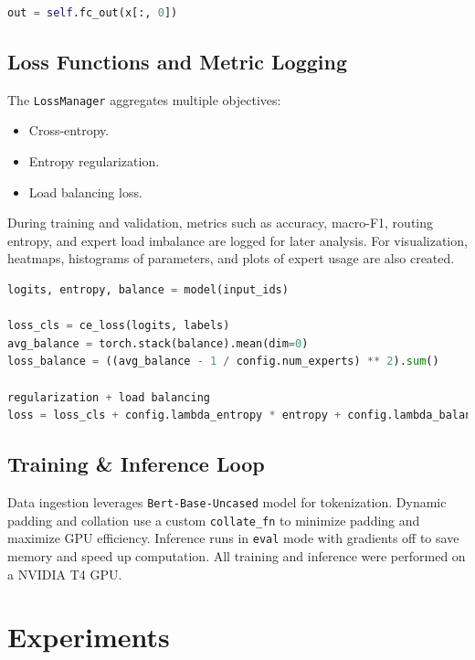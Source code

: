 \documentclass{article}
\begin{document}
\vspace{3pt}
\begin{lstlisting}[language=Python, caption=\texttt{x[:, 0]} is the final token embedding., label={lst:output}]
out = self.fc_out(x[:, 0])
\end{lstlisting}


\subsection{Loss Functions and Metric Logging}
The \texttt{LossManager} aggregates multiple objectives:
\begin{itemize}
    \item Cross-entropy.
    \item Entropy regularization.
    \item Load balancing loss.
\end{itemize}
During training and validation, metrics such as accuracy, macro-F1, routing entropy, and expert load imbalance are logged for later analysis. For visualization, heatmaps, histograms of parameters, and plots of expert usage are also created. 

\vspace{3pt}
\begin{lstlisting}[language=Python, caption=Loss calculations, label={lst:loss}]
logits, entropy, balance = model(input_ids)

loss_cls = ce_loss(logits, labels) 
avg_balance = torch.stack(balance).mean(dim=0)
loss_balance = ((avg_balance - 1 / config.num_experts) ** 2).sum()

regularization + load balancing
loss = loss_cls + config.lambda_entropy * entropy + config.lambda_balance * loss_balance
\end{lstlisting}


\subsection{Training \& Inference Loop}
Data ingestion leverages \texttt{Bert-Base-Uncased} model for tokenization. Dynamic padding and collation use a custom \texttt{collate\_fn} to minimize padding and maximize GPU efficiency.
Inference runs in \texttt{eval} mode with gradients off to save memory and speed up computation. All training and inference were performed on a NVIDIA T4 GPU. 


\section{Experiments}
\end{document}
